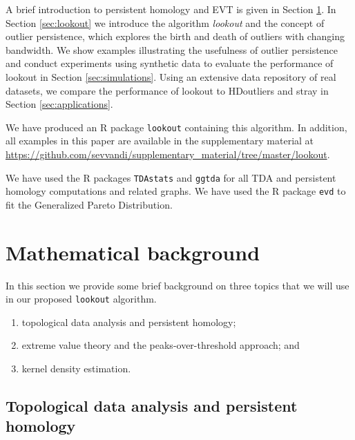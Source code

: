 \documentclass[11pt,a4paper,]{article}
\providecommand{\tightlist}{%
  \setlength{\itemsep}{0pt}\setlength{\parskip}{0pt}}
\theoremstyle{definition}
\theoremstyle{definition}
\theoremstyle{definition}
\theoremstyle{remark}
\begin{document}
A brief introduction to persistent homology and EVT is given in Section \ref{sec:methodology}. In Section \ref{sec:lookout} we introduce the algorithm \emph{lookout} and the concept of outlier persistence, which explores the birth and death of outliers with changing bandwidth. We show examples illustrating the usefulness of outlier persistence and conduct experiments using synthetic data to evaluate the performance of lookout in Section \ref{sec:simulations}. Using an extensive data repository of real datasets, we compare the performance of lookout to HDoutliers and stray in Section \ref{sec:applications}.

We have produced an R package \texttt{lookout} \autocite{lookoutR} containing this algorithm. In addition, all examples in this paper are available in the supplementary material at \url{https://github.com/sevvandi/supplementary_material/tree/master/lookout}.

We have used the R packages \texttt{TDAstats} \autocite{tdastatsR} and \texttt{ggtda} \autocite{ggdta} for all TDA and persistent homology computations and related graphs. We have used the R package \texttt{evd} \autocite{evdR} to fit the Generalized Pareto Distribution.

\hypertarget{sec:methodology}{%
\section{Mathematical background}\label{sec:methodology}}

In this section we provide some brief background on three topics that we will use in our proposed \texttt{lookout} algorithm.

\begin{enumerate}
\def\labelenumi{\arabic{enumi}.}
\tightlist
\item
  topological data analysis and persistent homology;
\item
  extreme value theory and the peaks-over-threshold approach; and
\item
  kernel density estimation.
\end{enumerate}

\hypertarget{subsec:tda}{%
\subsection{Topological data analysis and persistent homology}\label{subsec:tda}}
\end{document}
